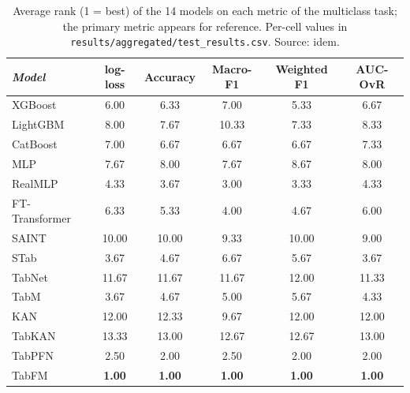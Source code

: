 \begin{table}[htbp]
\centering
\small
\caption[Secondary metrics --- multiclass task]{Average rank (1 = best) of the 14 models on each metric of the multiclass task; the primary metric appears for reference. Per-cell values in \texttt{results/\allowbreak aggregated/\allowbreak test\_\allowbreak results.\allowbreak csv}. Source: idem.}
\label{tab:app-secundarias-multiclass}
\begin{tabular}{lccccc}
\toprule
\emph{Model} & log-loss & Accuracy & Macro-F1 & Weighted F1 & AUC-OvR \\
\midrule
XGBoost & 6.00 & 6.33 & 7.00 & 5.33 & 6.67 \\
LightGBM & 8.00 & 7.67 & 10.33 & 7.33 & 8.33 \\
CatBoost & 7.00 & 6.67 & 6.67 & 6.67 & 7.33 \\
MLP & 7.67 & 8.00 & 7.67 & 8.67 & 8.00 \\
RealMLP & 4.33 & 3.67 & 3.00 & 3.33 & 4.33 \\
FT-Transformer & 6.33 & 5.33 & 4.00 & 4.67 & 6.00 \\
SAINT & 10.00 & 10.00 & 9.33 & 10.00 & 9.00 \\
STab & 3.67 & 4.67 & 6.67 & 5.67 & 3.67 \\
TabNet & 11.67 & 11.67 & 11.67 & 12.00 & 11.33 \\
TabM & 3.67 & 4.67 & 5.00 & 5.67 & 4.33 \\
KAN & 12.00 & 12.33 & 9.67 & 12.00 & 12.00 \\
TabKAN & 13.33 & 13.00 & 12.67 & 12.67 & 13.00 \\
TabPFN & 2.50 & 2.00 & 2.50 & 2.00 & 2.00 \\
TabFM & \textbf{1.00} & \textbf{1.00} & \textbf{1.00} & \textbf{1.00} & \textbf{1.00} \\
\bottomrule
\end{tabular}
\end{table}

